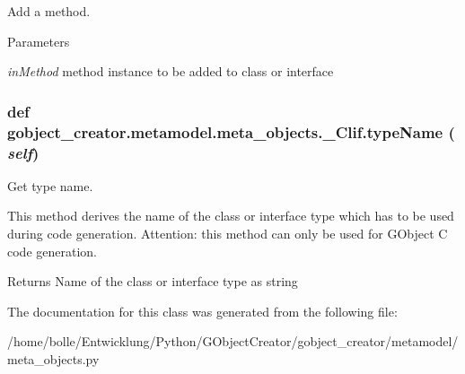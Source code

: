 Add a method. 


\begin{DoxyParams}{Parameters}
\item[{\em inMethod}]method instance to be added to class or interface \end{DoxyParams}
\hypertarget{classgobject__creator_1_1metamodel_1_1meta__objects_1_1__Clif_a906ce7adf382ff1f2377a4aff5fec782}{
\subsubsection[{typeName}]{\setlength{\rightskip}{0pt plus 5cm}def gobject\_\-creator.metamodel.meta\_\-objects.\_\-Clif.typeName ( {\em self})}}
\label{classgobject__creator_1_1metamodel_1_1meta__objects_1_1__Clif_a906ce7adf382ff1f2377a4aff5fec782}


Get type name. 

This method derives the name of the class or interface type which has to be used during code generation. Attention: this method can only be used for GObject C code generation. \begin{DoxyReturn}{Returns}
Name of the class or interface type as string 
\end{DoxyReturn}


The documentation for this class was generated from the following file:\begin{DoxyCompactItemize}
\item 
/home/bolle/Entwicklung/Python/GObjectCreator/gobject\_\-creator/metamodel/meta\_\-objects.py\end{DoxyCompactItemize}
